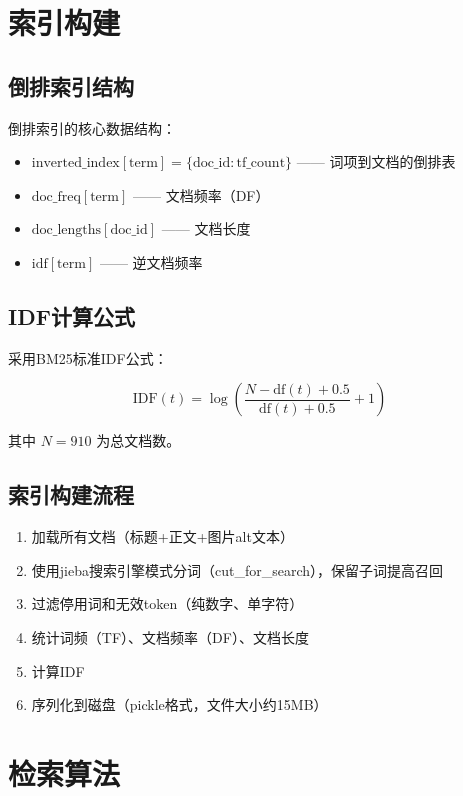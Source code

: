 \documentclass[12pt,a4paper]{ctexart}
\begin{document}
\section{索引构建}

\subsection{倒排索引结构}

倒排索引的核心数据结构：
\begin{itemize}
    \item $\text{inverted\_index}[\text{term}] = \{\text{doc\_id}: \text{tf\_count}\}$ —— 词项到文档的倒排表
    \item $\text{doc\_freq}[\text{term}]$ —— 文档频率（DF）
    \item $\text{doc\_lengths}[\text{doc\_id}]$ —— 文档长度
    \item $\text{idf}[\text{term}]$ —— 逆文档频率
\end{itemize}

\subsection{IDF计算公式}

采用BM25标准IDF公式：

\[
\text{IDF}(t) = \log\left(\frac{N - \text{df}(t) + 0.5}{\text{df}(t) + 0.5} + 1\right)
\]

其中 $N=910$ 为总文档数。

\subsection{索引构建流程}

\begin{enumerate}
    \item 加载所有文档（标题+正文+图片alt文本）
    \item 使用jieba搜索引擎模式分词（cut\_for\_search），保留子词提高召回
    \item 过滤停用词和无效token（纯数字、单字符）
    \item 统计词频（TF）、文档频率（DF）、文档长度
    \item 计算IDF
    \item 序列化到磁盘（pickle格式，文件大小约15MB）
\end{enumerate}

\section{检索算法}
\end{document}
